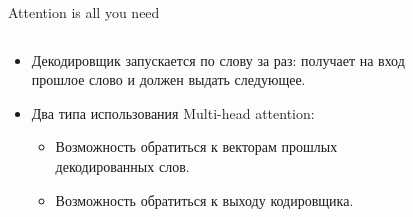 \begin{frame}[c]{Attention is all you need}
\begin{columns}[c]
	\begin{column}{0.7\textwidth}
		\begin{itemize}
			\item Декодировщик запускается по слову за раз: получает на вход прошлое слово и должен выдать следующее.
			\item Два типа использования Multi-head attention:
			\begin{itemize}
				[circle]
				\item Возможность обратиться к векторам прошлых декодированных слов.
				\item Возможность обратиться к выходу кодировщика.
			\end{itemize}
		\end{itemize}
	\end{column}
	\begin{column}{0.3\textwidth}
		\begin{figure}
			\centering

\end{figure}
\end{column}
\end{columns}
\end{frame}
